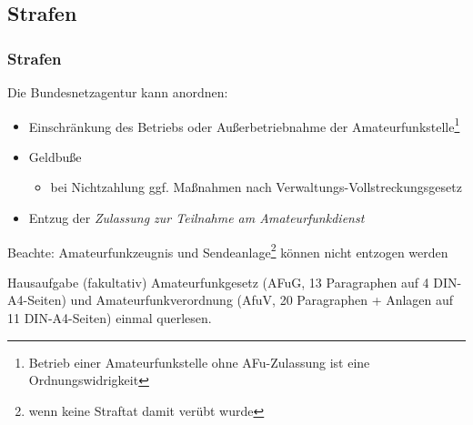\subsection{Strafen}

\begin{frame}
    \frametitle{Strafen}

    Die Bundesnetzagentur kann anordnen:

    \begin{itemize}
        \item Einschränkung des Betriebs oder Außerbetriebnahme der
              Amateurfunkstelle\footnote{Betrieb einer Amateurfunkstelle ohne
              AFu-Zulassung ist eine Ordnungswidrigkeit}
        \item Geldbuße
        \begin{itemize}
            \item bei Nichtzahlung ggf. Maßnahmen nach Verwaltungs-Vollstreckungsgesetz
        \end{itemize}
        \item Entzug der \emph{Zulassung zur Teilnahme am Amateurfunkdienst}
    \end{itemize}

    \vspace{1em}

    Beachte: Amateurfunkzeugnis und Sendeanlage\footnote{wenn keine Straftat
    damit verübt wurde} können nicht entzogen werden

\end{frame}

\begin{frame}

    \begin{alertblock}{Hausaufgabe (fakultativ)}
        Amateurfunkgesetz (AFuG, 13 Paragraphen auf 4 DIN-A4-Seiten) und
        Amateurfunkverordnung (AfuV, 20 Paragraphen + Anlagen auf 11
        DIN-A4-Seiten) einmal querlesen.
    \end{alertblock}

\end{frame}

\renewcommand{\refname}{Referenzen}

